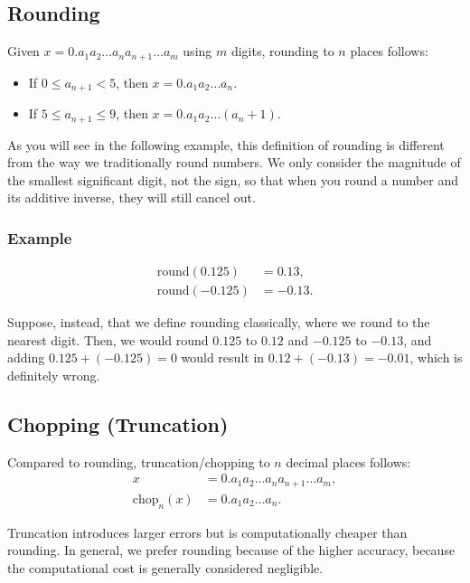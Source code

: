 \subsection{Rounding}
Given $x = 0.a_1 a_2 \dots a_n a_{n+1} \dots a_m$ using $m$ digits, rounding 
to $n$ places follows:
\begin{itemize}
  \item If $0 \leq a_{n+1} < 5$, then $x = 0.a_1 a_2 \dots a_n$.
  \item If $5 \leq a_{n+1} \leq 9$, then $x = 0.a_1 a_2 \dots (a_n + 1)$.
\end{itemize}
As you will see in the following example, this definition of rounding is
different from the way we traditionally round numbers. We only consider the
magnitude of the smallest significant digit, not the sign, so that when you
round a number and its additive inverse, they will still cancel out.

\subsubsection{Example}
\begin{align*}
  \text{round}(0.125) &= 0.13, \\
  \text{round}(-0.125) &= -0.13.
\end{align*}

Suppose, instead, that we define rounding classically, where we round to the
nearest digit. Then, we would round $0.125$ to $0.12$ and $-0.125$ to $-0.13$,
and adding $0.125+ (-0.125) = 0$ would result in $0.12 + (-0.13) = -0.01$, which
is definitely wrong.

\subsection{Chopping (Truncation)}
Compared to rounding, truncation/chopping to $n$ decimal places follows:
\begin{align*}
  x &= 0.a_1 a_2 \dots a_na_{n+1} \dots a_m, \\
  \text{chop}_n(x) &= 0.a_1 a_2 \dots a_n.
\end{align*}

Truncation introduces larger errors but is computationally cheaper than 
rounding. In general, we prefer rounding because of the higher accuracy, because
the computational cost is generally considered negligible.


